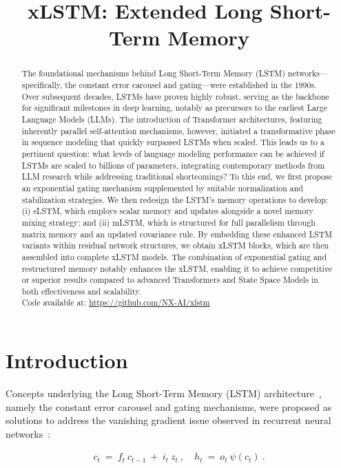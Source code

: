 \title{xLSTM: Extended Long Short-Term Memory}

\begin{abstract}
The foundational mechanisms behind Long Short-Term Memory (LSTM) networks—specifically, the constant error carousel and gating—were established in the 1990s. Over subsequent decades, LSTMs have proven highly robust, serving as the backbone for significant milestones in deep learning, notably as precursors to the earliest Large Language Models (LLMs). The introduction of Transformer architectures, featuring inherently parallel self-attention mechanisms, however, initiated a transformative phase in sequence modeling that quickly surpassed LSTMs when scaled. This leads us to a pertinent question: what levels of language modeling performance can be achieved if LSTMs are scaled to billions of parameters, integrating contemporary methods from LLM research while addressing traditional shortcomings? To this end, we first propose an exponential gating mechanism supplemented by suitable normalization and stabilization strategies. We then redesign the LSTM’s memory operations to develop: (i) sLSTM, which employs scalar memory and updates alongside a novel memory mixing strategy; and (ii) mLSTM, which is structured for full parallelism through matrix memory and an updated covariance rule. By embedding these enhanced LSTM variants within residual network structures, we obtain xLSTM blocks, which are then assembled into complete xLSTM models. The combination of exponential gating and restructured memory notably enhances the xLSTM, enabling it to achieve competitive or superior results compared to advanced Transformers and State Space Models in both effectiveness and scalability.\\
Code available at: \url{https://github.com/NX-AI/xlstm}
\end{abstract}

\section{Introduction}
\label{sec:intro}

Concepts underlying the Long Short-Term Memory (LSTM) architecture~\citep{Hochreiter:91,Hochreiter:97nips,Hochreiter:97}, namely the constant error carousel and gating mechanisms, were proposed as solutions to address the vanishing gradient issue observed in recurrent neural networks~\citep{Hochreiter:91,Hochreiter:00book}:

\begin{align}
\label{eq:lstm_idea}
  c_t \ = \ f_t \ c_{t-1} \ + \ 
          i_t \  z_t \ , \quad  
          h_t \ = \ o_t \ \psi({c_t}) \ . 
\end{align}

